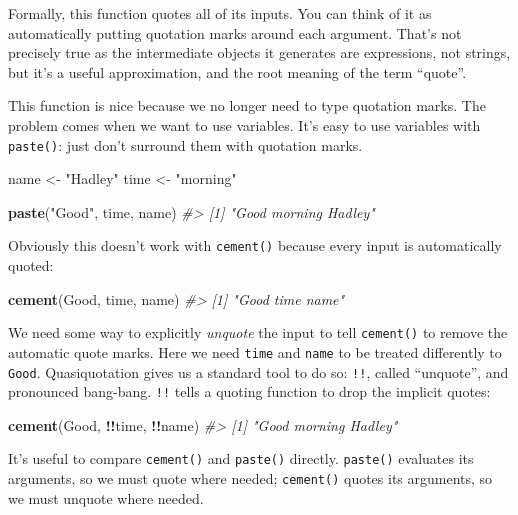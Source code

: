\documentclass[]{book}
\newenvironment{Shaded}{\begin{snugshade}}{\end{snugshade}}
\newcommand{\CommentTok}[1]{\textcolor[rgb]{0.37,0.37,0.37}{\textit{#1}}}
\newcommand{\KeywordTok}[1]{\textcolor[rgb]{0.27,0.27,0.27}{\textbf{#1}}}
\newcommand{\NormalTok}[1]{#1}
\newcommand{\OperatorTok}[1]{\textcolor[rgb]{0.43,0.43,0.43}{\textbf{#1}}}
\newcommand{\StringTok}[1]{\textcolor[rgb]{0.5,0.5,0.5}{#1}}
\begin{document}
Formally, this function quotes all of its inputs. You can think of it as automatically putting quotation marks around each argument. That's not precisely true as the intermediate objects it generates are expressions, not strings, but it's a useful approximation, and the root meaning of the term ``quote''.

This function is nice because we no longer need to type quotation marks. The problem comes when we want to use variables. It's easy to use variables with \texttt{paste()}: just don't surround them with quotation marks.

\begin{Shaded}
\begin{Highlighting}[]
\NormalTok{name <-}\StringTok{ "Hadley"}
\NormalTok{time <-}\StringTok{ "morning"}

\KeywordTok{paste}\NormalTok{(}\StringTok{"Good"}\NormalTok{, time, name)}
\CommentTok{#> [1] "Good morning Hadley"}
\end{Highlighting}
\end{Shaded}

Obviously this doesn't work with \texttt{cement()} because every input is automatically quoted:

\begin{Shaded}
\begin{Highlighting}[]
\KeywordTok{cement}\NormalTok{(Good, time, name)}
\CommentTok{#> [1] "Good time name"}
\end{Highlighting}
\end{Shaded}

We need some way to explicitly \emph{unquote} the input to tell \texttt{cement()} to remove the automatic quote marks. Here we need \texttt{time} and \texttt{name} to be treated differently to \texttt{Good}. Quasiquotation gives us a standard tool to do so: \texttt{!!}, called ``unquote'', and pronounced bang-bang. \texttt{!!} tells a quoting function to drop the implicit quotes:

\begin{Shaded}
\begin{Highlighting}[]
\KeywordTok{cement}\NormalTok{(Good, }\OperatorTok{!!}\NormalTok{time, }\OperatorTok{!!}\NormalTok{name)}
\CommentTok{#> [1] "Good morning Hadley"}
\end{Highlighting}
\end{Shaded}

It's useful to compare \texttt{cement()} and \texttt{paste()} directly. \texttt{paste()} evaluates its arguments, so we must quote where needed; \texttt{cement()} quotes its arguments, so we must unquote where needed.
\end{document}
